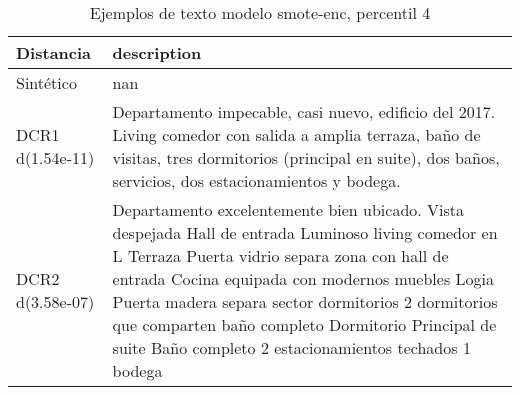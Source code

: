 \begin{table}[H]
\centering
\fontsize{10}{14}\selectfont
\caption{Ejemplos de texto modelo smote-enc, percentil 4}
\label{table-example-economicos-a-1-smote-enc-4p-text}
\begin{tabular}{|l|m{35em}|}
\hline
\rowcolor[gray]{0.8}
Distancia & description \\
\hline Sintético & nan \\
\hline DCR1 d(1.54e-11) & Departamento impecable, casi nuevo, edificio del 2017. Living comedor con salida a amplia terraza, ba\~no de visitas, tres dormitorios (principal en suite), dos ba\~nos, servicios, dos estacionamientos y bodega. \\
\hline DCR2 d(3.58e-07) & Departamento excelentemente bien ubicado. Vista despejada  Hall de entrada Luminoso living comedor en L Terraza Puerta vidrio separa zona con hall de entrada Cocina equipada con modernos muebles Logia Puerta madera separa sector dormitorios 2 dormitorios que comparten ba\~no completo Dormitorio Principal de suite Ba\~no completo  2 estacionamientos techados 1 bodega \\
\hline
\end{tabular}
\end{table}
